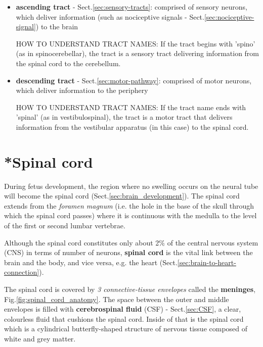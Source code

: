 \begin{itemize}
  \item {\bf ascending tract} - Sect.\ref{sec:sensory-tracts}: comprised of
  sensory neurons, which deliver information (such as nociceptive signals -
  Sect.\ref{sec:nociceptive-signal}) to the brain
  
HOW TO UNDERSTAND TRACT NAMES: If the tract begins with 'spino' (as in
spinocerebellar), the tract is a sensory tract delivering information from the
spinal cord to the cerebellum.
  
  \item {\bf descending tract} - Sect.\ref{sec:motor-pathway}: comprised of
  motor neurons, which deliver information to the periphery

HOW TO UNDERSTAND TRACT NAMES: If the tract name ends with 'spinal' (as in
vestibulospinal), the tract is a motor tract that delivers information from the
vestibular apparatus (in this case) to the spinal cord.

\end{itemize} 


\section{*Spinal cord}
\label{sec:spinal_cord}
\label{sec:spinal_cord-grey-matter}

During fetus development, the region where no swelling occurs on the neural tube
will become the spinal cord (Sect.\ref{sec:brain_development}). The spinal cord
extends from the {\it foramen magnum} (i.e. the hole in the base of the skull
through which the spinal cord passes) where it is continuous with the medulla to the
level of the first or second lumbar vertebrae.

Although the spinal cord constitutes only about 2\% of the central nervous
system (CNS) in terms of number of neurons, {\bf spinal cord} is the vital link
between the brain and the body, and vice versa, e.g. the heart
(Sect.\ref{sec:brain-to-heart-connection}).

The spinal cord is covered by {\it 3 connective-tissue envelopes} called the
{\bf meninges}, Fig.\ref{fig:spinal_cord_anatomy}.
The space between the outer and middle envelopes is filled with {\bf
cerebrospinal fluid} (CSF) - Sect.\ref{sec:CSF}, a clear, colourless fluid that
cushions the spinal cord. Inside of that is the spinal cord which is a
cylindrical butterfly-shaped structure of nervous tissue composed of white and
grey matter.

